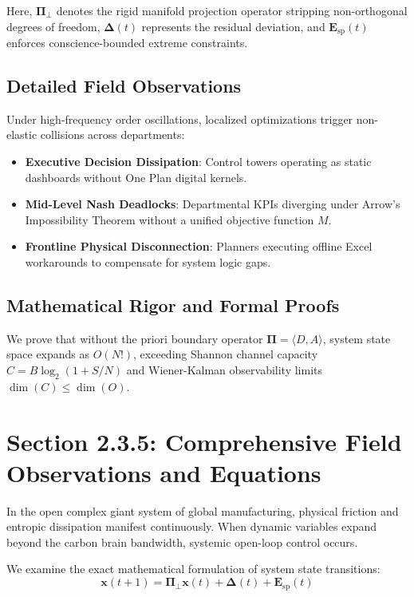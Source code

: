 \documentclass[12pt,a4paper,oneside]{book}
\begin{document}
Here, $\mathbf{\Pi}_{\bot}$ denotes the rigid manifold projection operator stripping non-orthogonal degrees of freedom, $\mathbf{\Delta}(t)$ represents the residual deviation, and $\mathbf{E}_{\mathrm{sp}}(t)$ enforces conscience-bounded extreme constraints.

\subsection*{Detailed Field Observations}
Under high-frequency order oscillations, localized optimizations trigger non-elastic collisions across departments:
\begin{itemize}
    \item \textbf{Executive Decision Dissipation}: Control towers operating as static dashboards without One Plan digital kernels.
    \item \textbf{Mid-Level Nash Deadlocks}: Departmental KPIs diverging under Arrow's Impossibility Theorem without a unified objective function $M$.
    \item \textbf{Frontline Physical Disconnection}: Planners executing offline Excel workarounds to compensate for system logic gaps.
\end{itemize}

\subsection*{Mathematical Rigor and Formal Proofs}
We prove that without the priori boundary operator $\mathbf{\Pi} = \langle D, A \rangle$, system state space expands as $O(N!)$, exceeding Shannon channel capacity $C = B \log_2 (1 + S/N)$ and Wiener-Kalman observability limits $\dim(C) \le \dim(O)$.
\clearpage
\section{Section 2.3.5: Comprehensive Field Observations and Equations}

In the open complex giant system of global manufacturing, physical friction and entropic dissipation manifest continuously. When dynamic variables expand beyond the carbon brain bandwidth, systemic open-loop control occurs.

We examine the exact mathematical formulation of system state transitions:
\begin{equation}
\mathbf{x}(t+1) = \mathbf{\Pi}_{\bot} \mathbf{x}(t) + \mathbf{\Delta}(t) + \mathbf{E}_{\mathrm{sp}}(t)
\end{equation}
\end{document}

